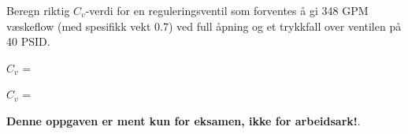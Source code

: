 

Beregn riktig $C_v$-verdi for en reguleringsventil som forventes å gi 348 GPM væskeflow (med spesifikk vekt 0.7) ved full åpning og et trykkfall over ventilen på 40 PSID.

\vskip 10pt

$C_v$ = \underbar{\hskip 50pt}







$C_v$ = 







{\bf Denne oppgaven er ment kun for eksamen, ikke for arbeidsark!}.


